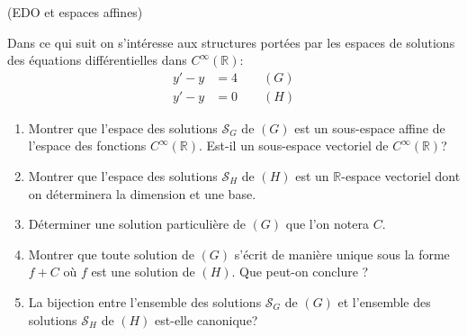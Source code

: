 \documentclass[a4paper,12pt,reqno]{amsart}
\begin{document}
\begin{exo} (EDO et espaces affines)

  Dans ce qui suit on s'intéresse aux structures portées par les espaces de solutions des équations différentielles dans $C^{\infty}(\mathbb{R})$:\vspace{-4mm}
    \begin{align*}
      y' - y &= 4 \qquad (G)\\
      y' - y &= 0 \qquad (H)
    \end{align*}

  \begin{enumerate}
    \item Montrer que l'espace des solutions $\mathcal{S}_{G}$ de $(G)$ est un sous-espace affine de l'espace des fonctions $C^{\infty}(\mathbb{R})$. Est-il un sous-espace vectoriel de $C^{\infty}(\mathbb{R})$?

    \item Montrer que l'espace des solutions $\mathcal{S}_{H}$ de $(H)$ est un $\mathbb{R}$-espace vectoriel dont on déterminera la dimension et une base.

    \item Déterminer une solution particulière de $(G)$ que l'on notera $C$.

    \item Montrer que toute solution de $(G)$ s'écrit de manière unique sous la forme $f+C$ où $f$ est une solution de $(H)$. Que peut-on conclure ?

    \item La bijection entre l'ensemble des solutions $\mathcal{S}_{G}$ de $(G)$ et l'ensemble des solutions $\mathcal{S}_{H}$ de $(H)$ est-elle canonique?

  \end{enumerate}
\end{exo}
\end{document}
